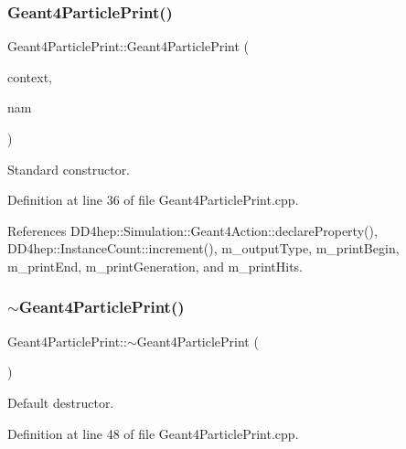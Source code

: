 \subsubsection{\texorpdfstring{Geant4\+Particle\+Print()}{Geant4ParticlePrint()}}
{\footnotesize\ttfamily Geant4\+Particle\+Print\+::\+Geant4\+Particle\+Print (\begin{DoxyParamCaption}\item[{\hyperlink{class_d_d4hep_1_1_simulation_1_1_geant4_context}{Geant4\+Context} $\ast$}]{context,  }\item[{const std\+::string \&}]{nam }\end{DoxyParamCaption})}



Standard constructor. 



Definition at line 36 of file Geant4\+Particle\+Print.\+cpp.



References D\+D4hep\+::\+Simulation\+::\+Geant4\+Action\+::declare\+Property(), D\+D4hep\+::\+Instance\+Count\+::increment(), m\+\_\+output\+Type, m\+\_\+print\+Begin, m\+\_\+print\+End, m\+\_\+print\+Generation, and m\+\_\+print\+Hits.

\hypertarget{class_d_d4hep_1_1_simulation_1_1_geant4_particle_print_a6a9afd3df558e060f8bb32db26de8433}{}\label{class_d_d4hep_1_1_simulation_1_1_geant4_particle_print_a6a9afd3df558e060f8bb32db26de8433} 
\subsubsection{\texorpdfstring{$\sim$\+Geant4\+Particle\+Print()}{~Geant4ParticlePrint()}}
{\footnotesize\ttfamily Geant4\+Particle\+Print\+::$\sim$\+Geant4\+Particle\+Print (\begin{DoxyParamCaption}{ }\end{DoxyParamCaption})\hspace{0.3cm}{\ttfamily [virtual]}}



Default destructor. 



Definition at line 48 of file Geant4\+Particle\+Print.\+cpp.



